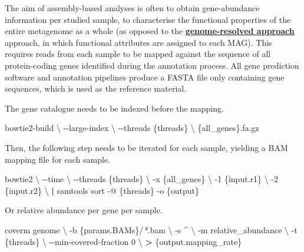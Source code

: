 \documentclass[
]{book}
\newenvironment{Shaded}{\begin{snugshade}}{\end{snugshade}}
\newcommand{\AttributeTok}[1]{\textcolor[rgb]{0.77,0.63,0.00}{#1}}
\newcommand{\DataTypeTok}[1]{\textcolor[rgb]{0.13,0.29,0.53}{#1}}
\newcommand{\ExtensionTok}[1]{#1}
\newcommand{\KeywordTok}[1]{\textcolor[rgb]{0.13,0.29,0.53}{\textbf{#1}}}
\newcommand{\NormalTok}[1]{#1}
\newcommand{\OperatorTok}[1]{\textcolor[rgb]{0.81,0.36,0.00}{\textbf{#1}}}
\newcommand{\PreprocessorTok}[1]{\textcolor[rgb]{0.56,0.35,0.01}{\textit{#1}}}
\begin{document}
The aim of assembly-based analyses is often to obtain gene-abundance information per studied sample, to characterise the functional properties of the entire metagenome as a whole (as opposed to the \textbf{\protect\hyperlink{genome-resolved}{genome-resolved approach}} approach, in which functional attributes are assigned to each MAG). This requires reads from each sample to be mapped against the sequence of all protein-coding genes identified during the annotation process. All gene prediction software and annotation pipelines produce a FASTA file only containing gene sequences, which is used as the reference material.

The gene catalogue needs to be indexed before the mapping.

\begin{Shaded}
\begin{Highlighting}[]
\ExtensionTok{bowtie2{-}build} \DataTypeTok{\textbackslash{}}
      \AttributeTok{{-}{-}large{-}index} \DataTypeTok{\textbackslash{}}
      \AttributeTok{{-}{-}threads}\NormalTok{ \{threads\} }\DataTypeTok{\textbackslash{}}
\NormalTok{       \{all\_genes\}.fa.gz}
\end{Highlighting}
\end{Shaded}

Then, the following step needs to be iterated for each sample, yielding a BAM mapping file for each sample.

\begin{Shaded}
\begin{Highlighting}[]
\ExtensionTok{bowtie2} \DataTypeTok{\textbackslash{}}
      \AttributeTok{{-}{-}time} \DataTypeTok{\textbackslash{}}
      \AttributeTok{{-}{-}threads}\NormalTok{ \{threads\} }\DataTypeTok{\textbackslash{}}
      \AttributeTok{{-}x}\NormalTok{ \{all\_genes\} }\DataTypeTok{\textbackslash{}}
      \AttributeTok{{-}1}\NormalTok{ \{input.r1\} }\DataTypeTok{\textbackslash{}}
      \AttributeTok{{-}2}\NormalTok{ \{input.r2\} }\DataTypeTok{\textbackslash{}}
      \KeywordTok{|} \ExtensionTok{samtools}\NormalTok{ sort }\AttributeTok{{-}@}\NormalTok{ \{threads\} }\AttributeTok{{-}o}\NormalTok{ \{output\}}
\end{Highlighting}
\end{Shaded}

Or relative abundance per gene per sample.

\begin{Shaded}
\begin{Highlighting}[]
\ExtensionTok{coverm}\NormalTok{ genome }\DataTypeTok{\textbackslash{}}
      \AttributeTok{{-}b}\NormalTok{ \{params.BAMs\}/}\PreprocessorTok{*}\NormalTok{.bam }\DataTypeTok{\textbackslash{}}
      \AttributeTok{{-}s}\NormalTok{ \^{} }\DataTypeTok{\textbackslash{}}
      \AttributeTok{{-}m}\NormalTok{ relative\_abundance }\DataTypeTok{\textbackslash{}}
      \AttributeTok{{-}t}\NormalTok{ \{threads\} }\DataTypeTok{\textbackslash{}}
      \AttributeTok{{-}{-}min{-}covered{-}fraction}\NormalTok{ 0 }\DataTypeTok{\textbackslash{}}
      \OperatorTok{\textgreater{}}\NormalTok{ \{output.mapping\_rate\}}
\end{Highlighting}
\end{Shaded}
\end{document}
